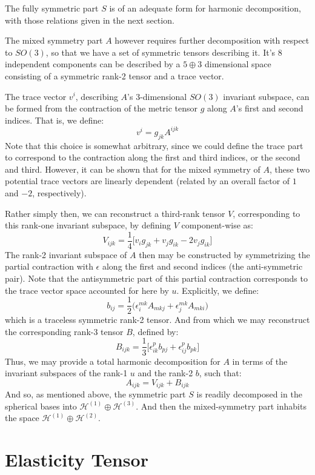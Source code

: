 \documentclass[10pt,a4paper]{article}
\begin{document}
The fully symmetric part $S$ is of an adequate form for harmonic decomposition, with those relations given in the next section.

The mixed symmetry part $A$ however requires further decomposition with respect to $SO(3)$, so that we have a set of symmetric tensors describing it. It's 8 independent components can be described by a $5\oplus 3$ dimensional space consisting of a symmetric rank-2 tensor and a trace vector.

The trace vector $v^i$, describing $A$'s 3-dimensional $SO(3)$ invariant subspace, can be formed from the contraction of the metric tensor $g$ along $A$'s first and second indices. That is, we define:
$$
v^i =g_{jk}A^{ijk}
$$
Note that this choice is somewhat arbitrary, since we could define the trace part to correspond to the contraction along the first and third indices, or the second and third. However, it can be shown that for the mixed symmetry of $A$, these two potential trace vectors are linearly dependent (related by an overall factor of $1$ and $-2$, respectively).

Rather simply then, we can reconstruct a third-rank tensor $V$, corresponding to this rank-one invariant subspace, by defining $V$ component-wise as:
$$
V_{ijk} =\frac{1}{4}\big[v_i g_{jk}+ v_j g_{ik} - 2 v_j g_{ik}\big]
$$
The rank-2 invariant subspace of $A$ then may be constructed by symmetrizing the partial contraction with $\epsilon$ along the first and second indices (the anti-symmetric pair). Note that the antisymmetric part of this partial contraction corresponds to the trace vector space accounted for here by $u$. Explicitly, we define:
$$
b_{ij}=\frac{1}{2}\big(\epsilon_{i}^{mk}A_{mkj}+\epsilon_{j}^{mk}A_{mki}\big)
$$
which is a traceless symmetric rank-2 tensor. And from which we may reconstruct the corresponding rank-3 tensor $B$, defined by:
$$
B_{ijk}=\frac{1}{3}\big[ \epsilon_{ik}^p b_{pj}+\epsilon_{ij}^p b_{pk}\big]
$$
Thus, we may provide a total harmonic decomposition for $A$ in terms of the invariant subspaces of the rank-1 $u$ and the rank-2 $b$, such that:
$$
A_{ijk} = V_{ijk} + B_{ijk}
$$
And so, as mentioned above, the symmetric part $S$ is readily decomposed in the spherical bases into $\mathcal{H}^{(1)}\oplus \mathcal{H}^{(3)}$. And then the mixed-symmetry part inhabits the space $\mathcal{H}^{(1)}\oplus \mathcal{H}^{(2)}$.



\section{Elasticity Tensor}
 
\end{document}
